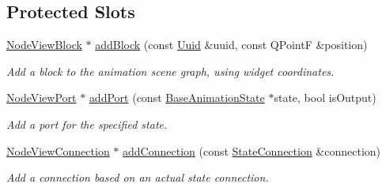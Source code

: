 \subsection*{Protected Slots}
\begin{DoxyCompactItemize}
\item 
\mbox{\label{classrev_1_1_view_1_1_animation_node_widget_a366790ba9af36e591317a5f07ca2c001}} 
\mbox{\hyperlink{classrev_1_1_view_1_1_node_view_block}{Node\+View\+Block}} $\ast$ \mbox{\hyperlink{classrev_1_1_view_1_1_animation_node_widget_a366790ba9af36e591317a5f07ca2c001}{add\+Block}} (const \mbox{\hyperlink{classrev_1_1_uuid}{Uuid}} \&uuid, const Q\+PointF \&position)
\begin{DoxyCompactList}\small\item\em Add a block to the animation scene graph, using widget coordinates. \end{DoxyCompactList}\item 
\mbox{\label{classrev_1_1_view_1_1_animation_node_widget_a8d2df137b7d0ffa4b6bbaf597c2e291b}} 
\mbox{\hyperlink{classrev_1_1_view_1_1_node_view_port}{Node\+View\+Port}} $\ast$ \mbox{\hyperlink{classrev_1_1_view_1_1_animation_node_widget_a8d2df137b7d0ffa4b6bbaf597c2e291b}{add\+Port}} (const \mbox{\hyperlink{classrev_1_1_base_animation_state}{Base\+Animation\+State}} $\ast$state, bool is\+Output)
\begin{DoxyCompactList}\small\item\em Add a port for the specified state. \end{DoxyCompactList}\item 
\mbox{\label{classrev_1_1_view_1_1_animation_node_widget_af80433cc281b8805c81faa31234da857}} 
\mbox{\hyperlink{classrev_1_1_view_1_1_node_view_connection}{Node\+View\+Connection}} $\ast$ \mbox{\hyperlink{classrev_1_1_view_1_1_animation_node_widget_af80433cc281b8805c81faa31234da857}{add\+Connection}} (const \mbox{\hyperlink{classrev_1_1_state_connection}{State\+Connection}} \&connection)
\begin{DoxyCompactList}\small\item\em Add a connection based on an actual state connection. \end{DoxyCompactList}\item 
\mbox{\label{classrev_1_1_view_1_1_animation_node_widget_a0211423edc17fbe37b72067c33b4dfca}} 

\end{DoxyCompactItemize}

